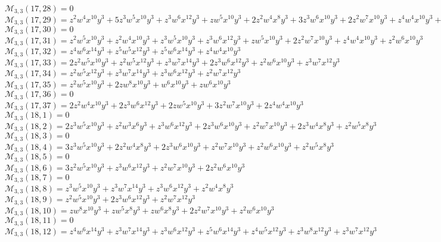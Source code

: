 $\mathcal{M}_{3,3}(17,28)=0$\\
$\mathcal{M}_{3,3}(17,29)=z^2w^4x^{10}y^3+5z^3w^5x^{10}y^3+z^3w^6x^{12}y^3+zw^5x^{10}y^3+2z^2w^4x^8y^3+3z^3w^6x^{10}y^3+2z^2w^7x^{10}y^3+z^4w^4x^{10}y^3+z^2w^5x^8y^3$\\
$\mathcal{M}_{3,3}(17,30)=0$\\
$\mathcal{M}_{3,3}(17,31)=z^2w^5x^{10}y^3+z^2w^4x^{10}y^3+z^3w^5x^{10}y^3+z^3w^6x^{12}y^3+zw^5x^{10}y^3+2z^2w^7x^{10}y^3+z^4w^4x^{10}y^3+z^2w^6x^{10}y^3$\\
$\mathcal{M}_{3,3}(17,32)=z^4w^6x^{14}y^3+z^5w^5x^{12}y^3+z^5w^6x^{14}y^3+z^4w^4x^{10}y^3$\\
$\mathcal{M}_{3,3}(17,33)=2z^2w^5x^{10}y^3+z^2w^5x^{12}y^3+z^3w^7x^{14}y^3+2z^3w^6x^{12}y^3+z^2w^6x^{10}y^3+z^3w^7x^{12}y^3$\\
$\mathcal{M}_{3,3}(17,34)=z^2w^5x^{12}y^3+z^3w^7x^{14}y^3+z^3w^6x^{12}y^3+z^2w^7x^{12}y^3$\\
$\mathcal{M}_{3,3}(17,35)=z^2w^5x^{10}y^3+2zw^8x^{10}y^3+w^6x^{10}y^3+zw^6x^{10}y^3$\\
$\mathcal{M}_{3,3}(17,36)=0$\\
$\mathcal{M}_{3,3}(17,37)=2z^2w^4x^{10}y^3+2z^3w^6x^{12}y^3+2zw^5x^{10}y^3+3z^2w^7x^{10}y^3+2z^4w^4x^{10}y^3$\\
$\mathcal{M}_{3,3}(18,1)=0$\\
$\mathcal{M}_{3,3}(18,2)=2z^3w^5x^{10}y^3+z^2w^3x^6y^3+z^3w^6x^{12}y^3+2z^3w^6x^{10}y^3+z^2w^7x^{10}y^3+2z^3w^4x^8y^3+z^2w^5x^8y^3$\\
$\mathcal{M}_{3,3}(18,3)=0$\\
$\mathcal{M}_{3,3}(18,4)=3z^3w^5x^{10}y^3+2z^2w^4x^8y^3+2z^3w^6x^{10}y^3+z^2w^7x^{10}y^3+z^2w^6x^{10}y^3+z^2w^5x^8y^3$\\
$\mathcal{M}_{3,3}(18,5)=0$\\
$\mathcal{M}_{3,3}(18,6)=3z^2w^5x^{10}y^3+z^3w^6x^{12}y^3+z^2w^7x^{10}y^3+2z^2w^6x^{10}y^3$\\
$\mathcal{M}_{3,3}(18,7)=0$\\
$\mathcal{M}_{3,3}(18,8)=z^3w^5x^{10}y^3+z^3w^7x^{14}y^3+z^3w^6x^{12}y^3+z^2w^4x^8y^3$\\
$\mathcal{M}_{3,3}(18,9)=z^2w^5x^{10}y^3+2z^3w^6x^{12}y^3+z^2w^7x^{12}y^3$\\
$\mathcal{M}_{3,3}(18,10)=zw^8x^{10}y^3+zw^5x^8y^3+zw^6x^8y^3+2z^2w^7x^{10}y^3+z^2w^6x^{10}y^3$\\
$\mathcal{M}_{3,3}(18,11)=0$\\
$\mathcal{M}_{3,3}(18,12)=z^4w^6x^{14}y^3+z^3w^7x^{14}y^3+z^3w^6x^{12}y^3+z^5w^6x^{14}y^3+z^4w^5x^{12}y^3+z^3w^8x^{12}y^3+z^3w^7x^{12}y^3$\\
